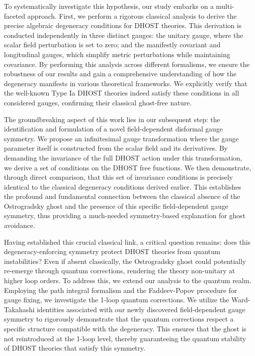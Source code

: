 \documentclass[twocolumn]{aastex631}
\begin{document}
To systematically investigate this hypothesis, our study embarks on a multi-faceted approach. First, we perform a rigorous classical analysis to derive the precise algebraic degeneracy conditions for DHOST theories. This derivation is conducted independently in three distinct gauges: the unitary gauge, where the scalar field perturbation is set to zero; and the manifestly covariant and longitudinal gauges, which simplify metric perturbations while maintaining covariance. By performing this analysis across different formalisms, we ensure the robustness of our results and gain a comprehensive understanding of how the degeneracy manifests in various theoretical frameworks. We explicitly verify that the well-known Type Ia DHOST theories indeed satisfy these conditions in all considered gauges, confirming their classical ghost-free nature.

The groundbreaking aspect of this work lies in our subsequent step: the identification and formulation of a novel field-dependent disformal gauge symmetry. We propose an infinitesimal gauge transformation where the gauge parameter itself is constructed from the scalar field and its derivatives. By demanding the invariance of the full DHOST action under this transformation, we derive a set of conditions on the DHOST free functions. We then demonstrate, through direct comparison, that this set of invariance conditions is precisely identical to the classical degeneracy conditions derived earlier. This establishes the profound and fundamental connection between the classical absence of the Ostrogradsky ghost and the presence of this specific field-dependent gauge symmetry, thus providing a much-needed symmetry-based explanation for ghost avoidance.

Having established this crucial classical link, a critical question remains: does this degeneracy-enforcing symmetry protect DHOST theories from quantum instabilities? Even if absent classically, the Ostrogradsky ghost could potentially re-emerge through quantum corrections, rendering the theory non-unitary at higher loop orders. To address this, we extend our analysis to the quantum realm. Employing the path integral formalism and the Faddeev-Popov procedure for gauge fixing, we investigate the 1-loop quantum corrections. We utilize the Ward-Takahashi identities associated with our newly discovered field-dependent gauge symmetry to rigorously demonstrate that the quantum corrections respect a specific structure compatible with the degeneracy. This ensures that the ghost is not reintroduced at the 1-loop level, thereby guaranteeing the quantum stability of DHOST theories that satisfy this symmetry.
\end{document}
